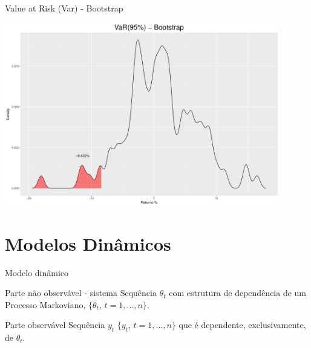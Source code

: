 \documentclass{beamer}
\begin{document}
\begin{frame}{Value at Risk (Var) - Bootstrap}

\begin{center}
 \includegraphics[height=8cm,keepaspectratio]{VAR_boots.pdf}
 \end{center}
 
\end{frame}



\section{Modelos Dinâmicos}


\begin{frame}{Modelo dinâmico}
\noindent

 
  \begin{block}{Parte não observável - sistema}
  {\large Sequência $\theta_t$ com estrutura de dependência de um Processo Markoviano, $\{\theta_t$, $t=1,...,n\}$.}
\end{block}

\pause
  \begin{block}{Parte observável}
  {\large Sequência $y_t$ $\{y_t$, $t=1,...,n\}$ que é dependente, exclusivamente, de $\theta_t$.}
\end{block}
  

\end{frame}
\end{document}
